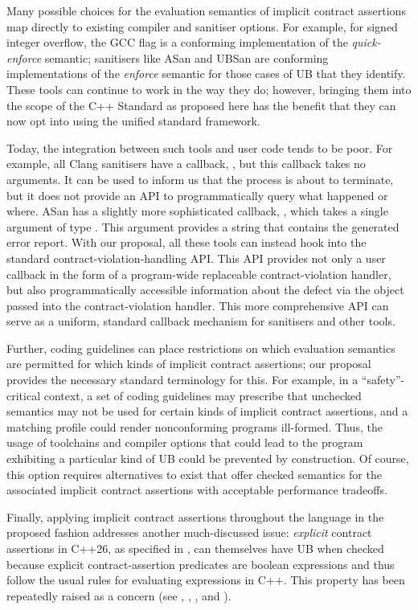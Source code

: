 {Many possible choices for the evaluation semantics of implicit contract assertions map directly to existing compiler and sanitiser options. For example, for signed integer overflow, the GCC flag  is a conforming implementation of the \emph{quick-enforce} semantic; sanitisers like ASan and UBSan are conforming implementations of the \emph{enforce} semantic for those cases of UB that they identify. These tools can continue to work in the way they do; however, bringing them into the scope of the C++ Standard as proposed here has the benefit that they can now opt into using the unified standard framework.

Today, the integration between such tools and user code tends to be poor. For example, all Clang sanitisers have a callback, , but this callback takes no arguments. It can be used to inform us that the process is about to terminate, but it does not provide an API to programmatically query what happened or where. ASan has a slightly more sophisticated callback, , which takes a single argument of type . This argument provides a string that contains the generated error report. With our proposal, all these tools can instead hook into the standard contract-violation-handling API. This API provides not only a user callback in the form of a  program-wide replaceable contract-violation handler, but also programmatically accessible information about the defect via the  \mbox{} object passed into the contract-violation handler. This more comprehensive API can serve as a uniform, standard callback mechanism for sanitisers and other tools.

Further, coding guidelines can place restrictions on which evaluation semantics are permitted for which kinds of implicit contract assertions; our proposal provides the necessary standard terminology for this. For example, in a ``safety''-critical context, a set of coding guidelines may prescribe that unchecked semantics may not be used for certain kinds of implicit contract assertions, and a matching profile could render nonconforming programs ill-formed. Thus, the usage of toolchains and compiler options that could lead to the program exhibiting a particular kind of UB could be prevented by construction. Of course, this option requires alternatives to exist that offer checked semantics for the associated implicit contract assertions with acceptable performance tradeoffs.

Finally, applying implicit contract assertions throughout the language in the proposed fashion addresses another much-discussed issue: \emph{explicit} contract assertions in C++26, as specified in \cite{P2900R14}, can themselves have UB when checked because explicit contract-assertion predicates are boolean expressions and thus follow the usual rules for evaluating expressions in C++. This property has been repeatedly raised as a concern (see \cite{P2680R1}, \cite{P3173R0}, \cite{P3285R0}, and \cite{P3362R0}).

}
